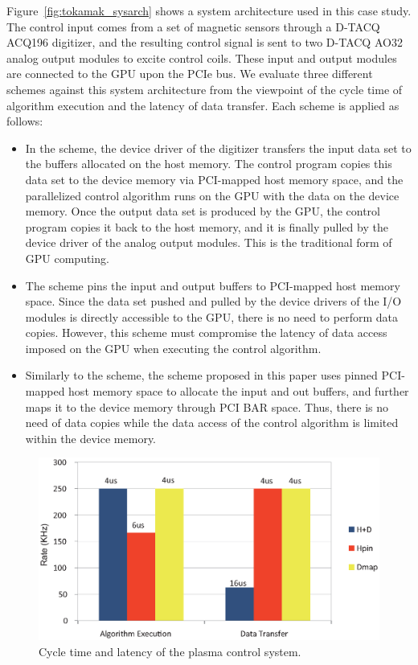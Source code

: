 Figure~\ref{fig:tokamak_sysarch} shows a system architecture used in
this case study.
The control input comes from a set of magnetic sensors through a D-TACQ
ACQ196 digitizer, and the resulting control signal is sent to two D-TACQ
AO32 analog output modules to excite control coils.
These input and output modules are connected to the GPU upon the PCIe
bus.
We evaluate three different schemes against this system architecture
from the viewpoint of the cycle time of algorithm execution and the
latency of data transfer. 
Each scheme is applied as follows:
\begin{itemize}
 \item In the {\hd} scheme, the device driver of the digitizer transfers
       the input data set to the buffers allocated on the host memory.
       The control program copies this data set to the device memory via
       PCI-mapped host memory space, and the parallelized control
       algorithm runs on the GPU with the data on the device memory.
       Once the output data set is produced by the GPU, the control
       program copies it back to the host memory, and it is finally
       pulled by the device driver of the analog output modules.
       This is the traditional form of GPU computing.
 \item The {\hp} scheme pins the input and output buffers to PCI-mapped
       host memory space.
       Since the data set pushed and pulled by the device drivers of
       the I/O modules is directly accessible to the GPU, there is no
       need to perform data copies.
       However, this scheme must compromise the latency of data access
       imposed on the GPU when executing the control algorithm.
 \item Similarly to the {\hp} scheme, the {\dm} scheme proposed in this
       paper uses pinned PCI-mapped host memory space to allocate the
       input and out buffers, and further maps it to the device memory
       through PCI BAR space.
       Thus, there is no need of data copies while the data access of
       the control algorithm is limited within the device memory.
\end{itemize}

\begin{figure}[t]
 \centering
 \includegraphics[width=\hsize]{eps/eval_plasma.eps}
 \caption{Cycle time and latency of the plasma control system.}
 \label{fig:eval_plasma}
\end{figure}

